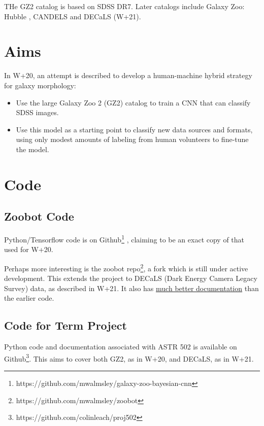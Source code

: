 \documentclass[preprint]{aastex63}
\begin{document}
THe GZ2 catalog \citep{willett_galaxy_2013, 2016MNRAS.461.3663H} is based on SDSS DR7. Later catalogs include Galaxy Zoo: Hubble \citep{2017MNRAS.464.4176W}, CANDELS \citep{2017MNRAS.464.4420S} and DECaLS (W+21).

\section{Aims}

In W+20, an attempt is described to develop a human-machine hybrid strategy for galaxy morphology:
\begin{itemize}
	\item Use the large Galaxy Zoo 2 (GZ2) catalog to train a CNN that can classify SDSS images.
	\item Use this model as a starting point to classify new data sources and formats, using only modest amounts of labeling from human volunteers to fine-tune the model.
\end{itemize}


\section{Code} \label{sec:code}

\subsection{Zoobot Code} \label{sec:zcode}

Python/Tensorflow code is on Github\footnote{https://github.com/mwalmsley/galaxy-zoo-bayesian-cnn} \citep{walmsley_mwalmsleygalaxy-zoo-bayesian-cnn_2019}, claiming to be an exact copy of that used for W+20.

Perhaps more interesting is the zoobot repo\footnote{https://github.com/mwalmsley/zoobot}, a fork which is still under active development. This extends the project to DECaLS (Dark Energy Camera Legacy Survey) data, as described in W+21. It also has \href{https://zoobot.readthedocs.io/}{much better documentation} than the earlier code.

\subsection{Code for Term Project}

Python code and documentation associated with ASTR 502 is available on Github\footnote{https://github.com/colinleach/proj502}. This aims to cover both GZ2, as in W+20, and DECaLS, as in W+21.
\end{document}
